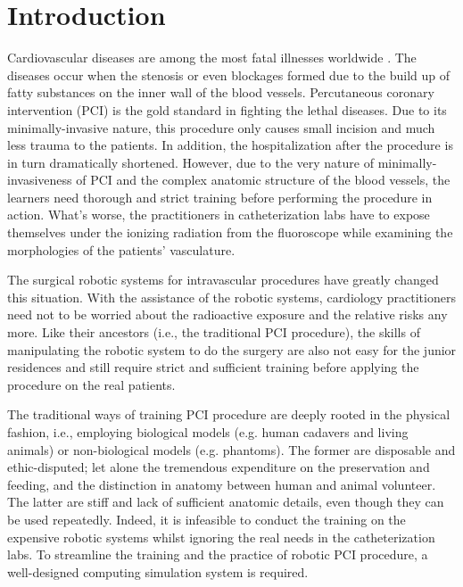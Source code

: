 
\section{Introduction}
\label{sec5_1}
Cardiovascular diseases are among the most fatal illnesses worldwide \cite{WHO2013}.
The diseases occur when the stenosis or even blockages formed due to the build up of fatty substances on the inner wall of the blood vessels.
Percutaneous coronary intervention (PCI) is the gold standard in fighting the lethal diseases.
Due to its minimally-invasive nature, this procedure only causes small incision and much less trauma to the patients.
In addition, the hospitalization after the procedure is in turn dramatically shortened.
However, due to the very nature of minimally-invasiveness of PCI and the complex anatomic structure of the blood vessels, the learners need thorough and strict training before performing the procedure in action. %
What's worse, the practitioners in catheterization labs have to expose themselves under the ionizing radiation from the fluoroscope while examining the morphologies of the patients' vasculature. %

The surgical robotic systems for intravascular procedures have greatly changed this situation.
With the assistance of the robotic systems, cardiology practitioners need not to be worried about the radioactive exposure and the relative risks any more.
Like their ancestors (i.e., the traditional PCI procedure), the skills of manipulating the robotic system to do the surgery are also not easy for the junior residences and still require strict and sufficient training before applying the procedure on the real patients. %

The traditional ways of training PCI procedure are deeply rooted in the physical fashion, i.e., employing biological models (e.g. human cadavers and living animals) or non-biological models (e.g. phantoms). %
The former are disposable and ethic-disputed; let alone the tremendous expenditure on the preservation and feeding, and the distinction in anatomy between human and animal volunteer. %
The latter are stiff and lack of sufficient anatomic details, even though they can be used repeatedly.
Indeed, it is infeasible to conduct the training on the expensive robotic systems whilst ignoring the real needs in the catheterization labs.
To streamline the training and the practice of robotic PCI procedure, a well-designed computing simulation system is required.

